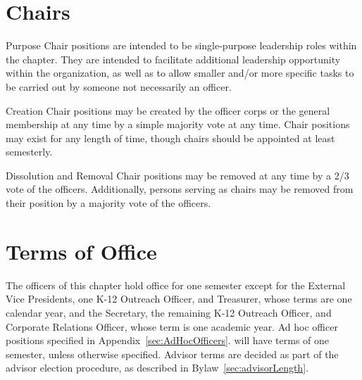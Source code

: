 \section{Chairs}
\begin{enumsubsection}
\item{Purpose} Chair positions are intended to be single-purpose leadership roles within the chapter. They are intended to facilitate additional leadership opportunity within the organization, as well as to allow smaller and/or more specific tasks to be carried out by someone not necessarily an officer.
\item{Creation} Chair positions may be created by the officer corps or the general membership at any time by a simple majority vote at any time. Chair positions may exist for any length of time, though chairs should be appointed at least semesterly.
\item{Dissolution and Removal} Chair positions may be removed at any time by a 2/3 vote of the officers. Additionally, persons serving as chairs may be removed from their position by a majority vote of the officers.
\end{enumsubsection}

\section{Terms of Office} The officers of this chapter hold office for one semester except for the External Vice Presidents, 
one K-12 Outreach Officer, and Treasurer, whose terms are one calendar year, and the Secretary, the remaining K-12 Outreach 
Officer, and Corporate Relations Officer, whose term is one academic year. Ad hoc officer positions specified in Appendix~\ref{sec:AdHocOfficers}. will have terms of one semester, unless otherwise specified. Advisor terms are decided as part of the advisor election procedure, as described in Bylaw~\ref{sec:advisorLength}.